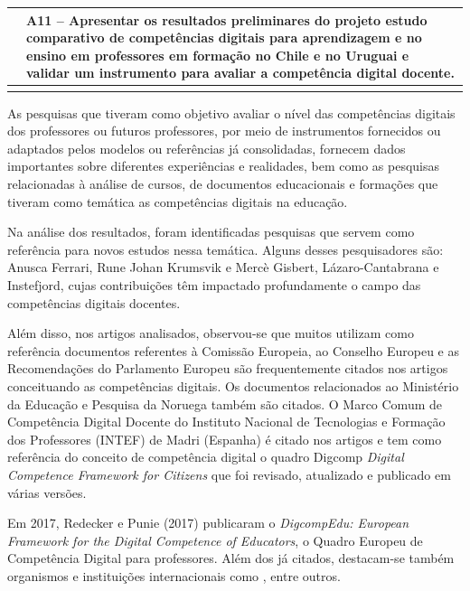 \documentclass[portuguese]{textolivre}
\begin{document}
\begin{footnotesize}
\begin{longtable}{
    >{\raggedright\arraybackslash}p{}
    >{\raggedright\arraybackslash}p{}
    }
									     & A11 – Apresentar os resultados preliminares do projeto estudo comparativo de competências digitais para aprendizagem e no ensino em professores em formação no Chile e no Uruguai e validar um instrumento para avaliar a competência digital docente. \\
\bottomrule
\source{\textcite{silva2022}.}
\end{longtable}
\end{footnotesize}

As pesquisas que tiveram como objetivo avaliar o nível das competências
digitais dos professores ou futuros professores, por meio de
instrumentos fornecidos ou adaptados pelos modelos ou referências já
consolidadas, fornecem dados importantes sobre diferentes experiências e
realidades, bem como as pesquisas relacionadas à análise de cursos, de
documentos educacionais e formações que tiveram como temática as
competências digitais na educação.

Na análise dos resultados, foram identificadas pesquisas que servem como
referência para novos estudos nessa temática. Alguns desses
pesquisadores são: Anusca Ferrari, Rune Johan Krumsvik e Mercè Gisbert,
Lázaro-Cantabrana e Instefjord, cujas contribuições têm impactado
profundamente o campo das competências digitais docentes.

Além disso, nos artigos analisados, observou-se que muitos utilizam como
referência documentos referentes à Comissão Europeia, ao Conselho
Europeu e as Recomendações do Parlamento Europeu são frequentemente
citados nos artigos conceituando as competências digitais. Os documentos
relacionados ao Ministério da Educação e Pesquisa da Noruega também são
citados. O Marco Comum de Competência Digital Docente do Instituto
Nacional de Tecnologias e Formação dos Professores (INTEF) de Madri
(Espanha) é citado nos artigos e tem como referência do conceito de
competência digital o quadro Digcomp \emph{Digital Competence Framework
for Citizens} \cite{ferrari2012} que foi revisado, atualizado e
publicado em várias versões.

Em 2017, \textcite{redecker2017}Redecker e Punie (2017) publicaram o \emph{DigcompEdu: European
Framework for the Digital Competence of Educators}, o Quadro Europeu de
Competência Digital para professores. Além dos já citados, destacam-se
também organismos e instituições internacionais como \textcite{unesco2008,ocde2011,mineduc2008,iste2008}, entre outros.
\end{document}
